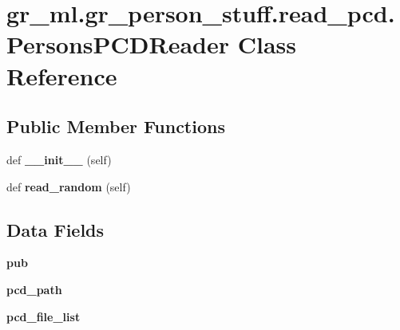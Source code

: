 \hypertarget{classgr__ml_1_1gr__person__stuff_1_1read__pcd_1_1PersonsPCDReader}{}\section{gr\+\_\+ml.\+gr\+\_\+person\+\_\+stuff.\+read\+\_\+pcd.\+Persons\+P\+C\+D\+Reader Class Reference}
\label{classgr__ml_1_1gr__person__stuff_1_1read__pcd_1_1PersonsPCDReader}
\subsection*{Public Member Functions}
\begin{DoxyCompactItemize}
\item 
\mbox{\label{classgr__ml_1_1gr__person__stuff_1_1read__pcd_1_1PersonsPCDReader_a49a442fc53e9a9f64eb57cd416d686d1}} 
def {\bfseries \+\_\+\+\_\+init\+\_\+\+\_\+} (self)
\item 
\mbox{\label{classgr__ml_1_1gr__person__stuff_1_1read__pcd_1_1PersonsPCDReader_a282c3f93d9ab32756aeffccfa51164ab}} 
def {\bfseries read\+\_\+random} (self)
\end{DoxyCompactItemize}
\subsection*{Data Fields}
\begin{DoxyCompactItemize}
\item 
\mbox{\label{classgr__ml_1_1gr__person__stuff_1_1read__pcd_1_1PersonsPCDReader_a603baf17d6ca6e8b551108c1483726f4}} 
{\bfseries pub}
\item 
\mbox{\label{classgr__ml_1_1gr__person__stuff_1_1read__pcd_1_1PersonsPCDReader_a867d01482d7adafe4e304de1ee8ebd90}} 
{\bfseries pcd\+\_\+path}
\item 
\mbox{\label{classgr__ml_1_1gr__person__stuff_1_1read__pcd_1_1PersonsPCDReader_a96a8de8a344953aed62146667e3a7229}} 
{\bfseries pcd\+\_\+file\+\_\+list}
\end{DoxyCompactItemize}


